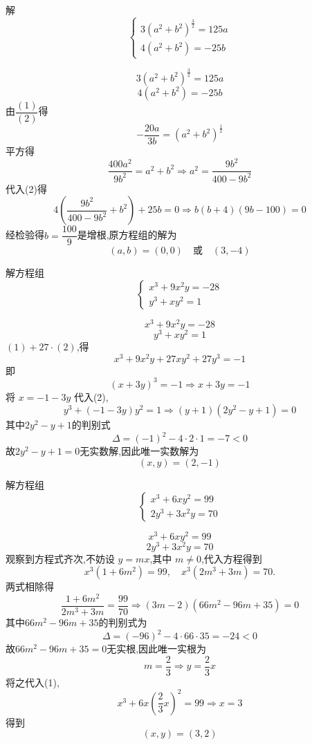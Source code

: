\begin{questions}
    \question 解
    \[
    \begin{cases}
    3(a^2+b^2)^{\frac32}=125a\\[4pt]
    4(a^2+b^2)=-25b
    \end{cases}
    \]
    \begin{solution}
        \[
        3(a^2+b^2)^{\frac32}=125a \tag{1}
        \]
        \[
        4(a^2+b^2)=-25b \tag{2}
        \]
        由$\dfrac{(1)}{(2)}$得
        \[
        -\frac{20a}{3b}=(a^2+b^2)^{\frac12}
        \]
        平方得
        \[
        \frac{400a^2}{9b^2}=a^2+b^2 \Rightarrow a^2=\frac{9b^2}{400-9b^2}
        \]
        代入(2)得
        \[
        4\left(\frac{9b^2}{400-9b^2}+b^2\right)+25b=0 \Rightarrow b(b+4)(9b-100)=0 
        \]
        经检验得$b=\dfrac{100}{9}$是增根,原方程组的解为
        \[
        (a,b)=(0,0)\quad \text{或} \quad (3,-4)
        \]
    \end{solution}

    \question 解方程组
    \[
    \begin{cases}
    x^3 + 9x^2y = -28 \\
    y^3 + xy^2 = 1
    \end{cases}
    \]
    \begin{solution}
        \[
        x^3 + 9x^2y = -28 \tag{1}
        \]
        \[
        y^3 + xy^2 = 1 \tag{2}
        \]
        $(1)+27\cdot (2)$,得
        \[
        x^3 + 9x^2y + 27xy^2 + 27y^3 = -1 
        \]
        即
        \[
        (x + 3y)^3 = -1 \Rightarrow x + 3y = -1
        \]
        将 $x = -1 - 3y$ 代入(2),
        \[
        y^3 + (-1 - 3y)y^2 = 1 \Rightarrow (y+1)(2y^2 - y + 1)=0
        \]
        其中$2y^2 - y + 1$的判别式
        \[
        \Delta = (-1)^2 - 4\cdot 2 \cdot 1 = -7 < 0
        \]
        故$2y^2 - y + 1=0$无实数解,因此唯一实数解为 
        \[
        (x, y) = (2, -1)
        \]
    \end{solution}

    \question 解方程组
    \[
    \begin{cases}
    x^3 + 6xy^2 = 99 \\
    2y^3 + 3x^2y = 70 
    \end{cases}
    \]
    \begin{solution}
        \[
        x^3 + 6xy^2 = 99 \tag{1}
        \]
        \[
        2y^3 + 3x^2y = 70 \tag{2}
        \]
        观察到方程式齐次,不妨设 $y = m x$,其中 $m \neq 0$,代入方程得到
        \[
        x^3 (1 + 6 m^2) = 99, \quad x^3 (2 m^3 + 3 m) = 70.
        \]
        两式相除得
        \[
        \frac{1 + 6 m^2}{2 m^3 + 3 m} = \frac{99}{70} \Rightarrow (3m - 2)(66 m^2 - 96 m + 35)=0
        \]
        其中$66 m^2 - 96 m + 35$的判别式为
        \[
        \Delta = (-96)^2 - 4 \cdot 66 \cdot 35 = -24 < 0
        \]
        故$66 m^2 - 96 m + 35=0$无实根,因此唯一实根为
        \[
        m = \frac{2}{3} \Rightarrow  y = \frac{2}{3} x
        \]
        将之代入(1),
        \[
        x^3 + 6 x \left(\frac{2}{3} x\right)^2 = 99 \Rightarrow x = 3
        \]
        得到
        \[
        (x, y) = (3, 2)
        \]
    \end{solution}


\end{questions}
